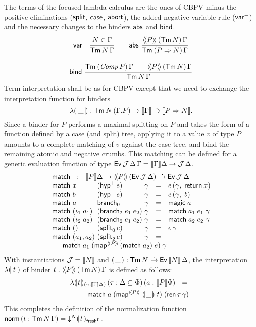 \documentclass[sigplan,screen,fleqn,review]{acmart} %
\begin{document}
The terms  of the focused lambda calculus are the
ones of CBPV minus the positive eliminations ($\tsplit$, $\tcase$,
$\tabort$), the added negative variable rule ($\nvar$) and the
necessary changes to the binders $\tabs$ and $\tbind$.
\begin{gather*}
  \nru{\nvar}{N \in \Gamma}{\Tm N \Gamma}
\qquad
  \nru{\tabs}
      {\AddHypP P {\tTm\, N} \Gamma}
      {\TmP {P \To N} \Gamma}
\\[2ex]
  \nru{\tbind}
      {\TmP {\Comp P} \Gamma \qquad \AddHypP P {\tTm\,N} \Gamma}
      {\Tm N \Gamma}
\end{gather*}
Term interpretation
shall be as for CBPV except that we need to exchange the
interpretation function for binders
\[
\fden\_ : \Tm N {(\cext
    \Gamma P)} \to \den \Gamma \todot \den{P \To N}
.\]
Since a binder
for $P$ performs a maximal splitting on $P$ and takes the form of a
function defined by a case (and split) tree,
applying it to a value $v$ of type $P$ amounts to a complete
matching of $v$ against the case tree, and bind the remaining
atomic and negative crumbs.  This matching can be defined for a
generic evaluation function of type
$\Evvv \J \Delta \Gamma = \den \Gamma \Delta \to \J\,\Delta$.
\[
\begin{array}{l@{~}l@{~}l@{~}lcl}
  \multicolumn 6 {l} {\tmatch ~~:~~ \den P \Delta \to
    \AddHypP P {\Evv \J \Delta} \todot \Evv \J \Delta }\\
  \tmatch & x & (\phyp\,e) & \gamma & = & e\,(\gamma,\; \treturn\,x) \\
  \tmatch & b & (\nhyp\,e) & \gamma & = & e\,(\gamma,\; b) \\
  \tmatch & a & \nbranch & \gamma & = & \tmagic\;a \\
  \tmatch & (\iota_1\;a_1) & (\bbranch\;e_1\;e_2) & \gamma & = &
    \tmatch\;a_1\;e_1\;\gamma \\
  \tmatch & (\iota_2\;a_2) & (\bbranch\;e_1\;e_2) & \gamma & = &
    \tmatch\;a_2\;e_2\;\gamma \\
  \tmatch & \ttempty & (\nsplit\,e) & \gamma & = & e\,\gamma \\
  \tmatch & (a_1,a_2) & (\bsplit\,e) & \gamma & = &
\\ \multicolumn 6 {@{\qquad}l}{
    \tmatch\;a_1\;(\tmap[\Add P]\,(\tmatch\;a_2)\;e)\;\gamma
}
\\
\end{array}
\]
With instantiations $\J = \den N$ and
$\denty\_ : \Tm N \todot \Evv {\den N} \Delta$,
the interpretation $\fden t$
of binder $t : \AddHypP P {\tTm\,N} \Gamma$
is defined as follows:
\begin{multline*}
  \fdent{t}
    {(\gamma : \den \Gamma \Delta)}
    \, (\tau : \Delta \sublist \Phi)
    \, (a : \den P \Phi)
    ~~=~~
\\ \qquad
    \tmatch
      \; a
      \; (\tmap[\Add P]\;\denty\_\;t)
      \; (\tren\,\tau\,\gamma)
\end{multline*}
This completes the definition of the normalization function
$\tnorm\, (t : \Tm N \Gamma)
  = \down N \dent t {\idenv\Gamma}$.
\end{document}
